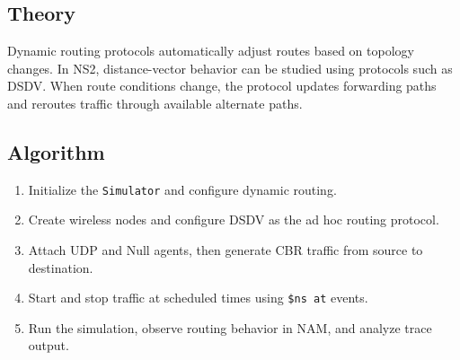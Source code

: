 \documentclass{article}
\begin{document}
\subsection{Theory}
Dynamic routing protocols automatically adjust routes based on topology changes. In NS2, distance-vector behavior can be studied using protocols such as DSDV. When route conditions change, the protocol updates forwarding paths and reroutes traffic through available alternate paths.

\subsection{Algorithm}
\begin{enumerate}
    \item Initialize the \texttt{Simulator} and configure dynamic routing.
    \item Create wireless nodes and configure DSDV as the ad hoc routing protocol.
    \item Attach UDP and Null agents, then generate CBR traffic from source to destination.
    \item Start and stop traffic at scheduled times using \texttt{\$ns at} events.
    \item Run the simulation, observe routing behavior in NAM, and analyze trace output.
\end{enumerate}
\end{document}
